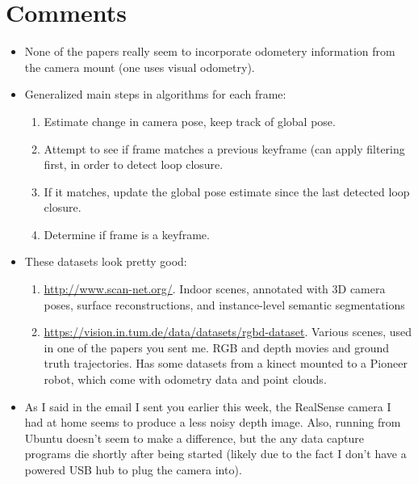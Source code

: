 \documentclass[12pt,a4paper]{article}
\begin{document}
\section{Comments}
\begin{itemize}
\item None of the papers really seem to incorporate odometery information from the camera mount (one uses visual odometry). 
\item Generalized main steps in algorithms for each frame:
\begin{enumerate}
\item Estimate change in camera pose, keep track of global pose.
\item Attempt to see if frame matches a previous keyframe (can apply filtering first, in order to detect loop closure. 
\item If it matches, update the global pose estimate since the last detected loop closure.
\item Determine if frame is a keyframe.
\end{enumerate}
\item These datasets look pretty good:
\begin{enumerate}
\item \url{http://www.scan-net.org/}. Indoor scenes, annotated with 3D camera poses, surface reconstructions, and instance-level semantic segmentations
\item \url{https://vision.in.tum.de/data/datasets/rgbd-dataset}. Various scenes, used in one of the papers you sent me. RGB and depth movies and ground truth trajectories. Has some datasets from a kinect mounted to a Pioneer robot, which come with odometry data and point clouds.
\end{enumerate}
\item As I said in the email I sent you earlier this week, the RealSense camera I had at home seems to produce a less noisy depth image. Also, running from Ubuntu doesn't seem to make a difference, but the any data capture programs die shortly after being started (likely due to the fact I don't have a powered USB hub to plug the camera into).
\end{itemize}
\end{document}
